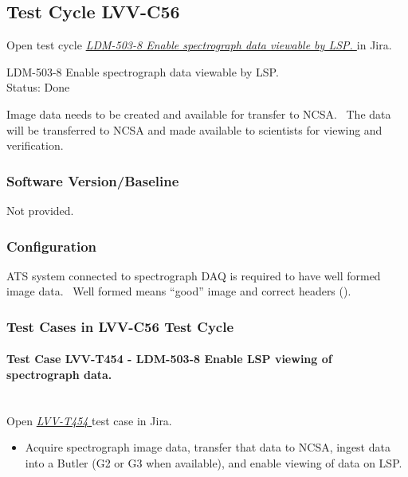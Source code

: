 \documentclass[DM,lsstdraft,STR,toc]{lsstdoc}
\providecommand{\tightlist}{
  \setlength{\itemsep}{0pt}\setlength{\parskip}{0pt}}
\begin{document}
  \subsection{Test Cycle LVV-C56 }

Open test cycle {\it \href{https://jira.lsstcorp.org/secure/Tests.jspa#/testrun/LVV-C56}{LDM-503-8 Enable spectrograph data viewable by LSP.
}} in Jira.

  LDM-503-8 Enable spectrograph data viewable by LSP.
\\
  Status: Done

  Image data needs to be created and available for transfer to NCSA. ~The
data will be transferred to NCSA and made available to scientists for
viewing and verification.~ ~~


  \subsubsection{Software Version/Baseline}
    Not provided.

  \subsubsection{Configuration}
    ATS system connected to spectrograph DAQ is required to have well formed
image data. ~Well formed means ``good'' image and correct headers
(). ~\\[2\baselineskip]


  \subsubsection{Test Cases in LVV-C56 Test Cycle}


    \paragraph{Test Case LVV-T454 - LDM-503-8 Enable LSP viewing of spectrograph data.
 }\mbox{}\\

Open  \href{https://jira.lsstcorp.org/secure/Tests.jspa#/testCase/LVV-T454}{\textit{ LVV-T454 } }
test case in Jira.

    \begin{itemize}
\tightlist
\item
  Acquire spectrograph image data, transfer that data to NCSA, ingest
  data into a Butler (G2 or G3 when available), and enable viewing of
  data on LSP. ~
\end{itemize}
\end{document}
